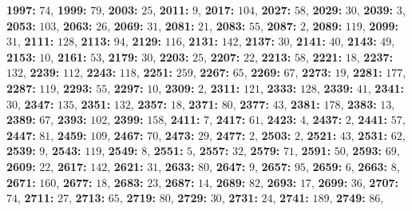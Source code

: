 \textsf{\bfseries 1997:} $74$, \textsf{\bfseries 1999:} $79$, \textsf{\bfseries 2003:} $25$, \textsf{\bfseries 2011:} $9$, \textsf{\bfseries 2017:} $104$, \textsf{\bfseries 2027:} $58$, \textsf{\bfseries 2029:} $30$, \textsf{\bfseries 2039:} $3$, \textsf{\bfseries 2053:} $103$, \textsf{\bfseries 2063:} $26$, \textsf{\bfseries 2069:} $31$, \textsf{\bfseries 2081:} $21$, \textsf{\bfseries 2083:} $55$, \textsf{\bfseries 2087:} $2$, \textsf{\bfseries 2089:} $119$, \textsf{\bfseries 2099:} $31$, \textsf{\bfseries 2111:} $128$, \textsf{\bfseries 2113:} $94$, \textsf{\bfseries 2129:} $116$, \textsf{\bfseries 2131:} $142$, \textsf{\bfseries 2137:} $30$, \textsf{\bfseries 2141:} $40$, \textsf{\bfseries 2143:} $49$, \textsf{\bfseries 2153:} $10$, \textsf{\bfseries 2161:} $53$, \textsf{\bfseries 2179:} $30$, \textsf{\bfseries 2203:} $25$, \textsf{\bfseries 2207:} $22$, \textsf{\bfseries 2213:} $58$, \textsf{\bfseries 2221:} $18$, \textsf{\bfseries 2237:} $132$, \textsf{\bfseries 2239:} $112$, \textsf{\bfseries 2243:} $118$, \textsf{\bfseries 2251:} $259$, \textsf{\bfseries 2267:} $65$, \textsf{\bfseries 2269:} $67$, \textsf{\bfseries 2273:} $19$, \textsf{\bfseries 2281:} $177$, \textsf{\bfseries 2287:} $119$, \textsf{\bfseries 2293:} $55$, \textsf{\bfseries 2297:} $10$, \textsf{\bfseries 2309:} $2$, \textsf{\bfseries 2311:} $121$, \textsf{\bfseries 2333:} $128$, \textsf{\bfseries 2339:} $41$, \textsf{\bfseries 2341:} $30$, \textsf{\bfseries 2347:} $135$, \textsf{\bfseries 2351:} $132$, \textsf{\bfseries 2357:} $18$, \textsf{\bfseries 2371:} $80$, \textsf{\bfseries 2377:} $43$, \textsf{\bfseries 2381:} $178$, \textsf{\bfseries 2383:} $13$, \textsf{\bfseries 2389:} $67$, \textsf{\bfseries 2393:} $102$, \textsf{\bfseries 2399:} $158$, \textsf{\bfseries 2411:} $7$, \textsf{\bfseries 2417:} $61$, \textsf{\bfseries 2423:} $4$, \textsf{\bfseries 2437:} $2$, \textsf{\bfseries 2441:} $57$, \textsf{\bfseries 2447:} $81$, \textsf{\bfseries 2459:} $109$, \textsf{\bfseries 2467:} $70$, \textsf{\bfseries 2473:} $29$, \textsf{\bfseries 2477:} $2$, \textsf{\bfseries 2503:} $2$, \textsf{\bfseries 2521:} $43$, \textsf{\bfseries 2531:} $62$, \textsf{\bfseries 2539:} $9$, \textsf{\bfseries 2543:} $119$, \textsf{\bfseries 2549:} $8$, \textsf{\bfseries 2551:} $5$, \textsf{\bfseries 2557:} $32$, \textsf{\bfseries 2579:} $71$, \textsf{\bfseries 2591:} $50$, \textsf{\bfseries 2593:} $69$, \textsf{\bfseries 2609:} $22$, \textsf{\bfseries 2617:} $142$, \textsf{\bfseries 2621:} $31$, \textsf{\bfseries 2633:} $80$, \textsf{\bfseries 2647:} $9$, \textsf{\bfseries 2657:} $95$, \textsf{\bfseries 2659:} $6$, \textsf{\bfseries 2663:} $8$, \textsf{\bfseries 2671:} $160$, \textsf{\bfseries 2677:} $18$, \textsf{\bfseries 2683:} $23$, \textsf{\bfseries 2687:} $14$, \textsf{\bfseries 2689:} $82$, \textsf{\bfseries 2693:} $17$, \textsf{\bfseries 2699:} $36$, \textsf{\bfseries 2707:} $74$, \textsf{\bfseries 2711:} $27$, \textsf{\bfseries 2713:} $65$, \textsf{\bfseries 2719:} $80$, \textsf{\bfseries 2729:} $30$, \textsf{\bfseries 2731:} $24$, \textsf{\bfseries 2741:} $189$, \textsf{\bfseries 2749:} $86$, 
